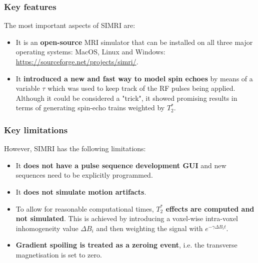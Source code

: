 \hfill

\subsubsection{Key features}
The most important aspects of SIMRI are:
\begin{itemize}

    \item It is an \textbf{open-source} MRI simulator that can be installed on all three major operating systems: MacOS, Linux and Windows: \url{https://sourceforge.net/projects/simri/}.
    
    
    \item It \textbf{introduced a new and fast way to model spin echoes} by means of a variable $\tau$ which was used to keep track of the RF pulses being applied. 
    Although it could be considered a "trick", it showed promising results in terms of generating spin-echo trains weighted by $T_2^*$.
    
\end{itemize}

\hfill

\subsubsection{Key limitations}
However, SIMRI has the following limitations:
\begin{itemize}
    
    \item It \textbf{does not have a pulse sequence development GUI} and new sequences need to be explicitly programmed.
    
    \item It \textbf{does not simulate motion artifacts}.
    
    \item To allow for reasonable computational times, \textbf{$T_2^*$ effects are computed and not simulated}.
    This is achieved by introducing a voxel-wise intra-voxel inhomogeneity value $\Delta B_i$ and then weighting the signal with $e^{- \gamma \Delta B_i t}$.
    
    \item \textbf{Gradient spoiling is treated as a zeroing event}, i.e. the transverse magnetisation is set to zero.
    
\end{itemize}

